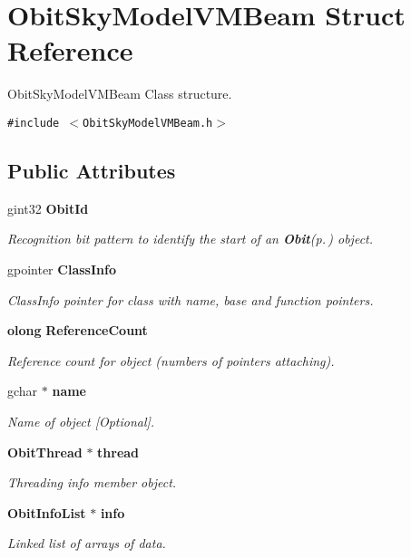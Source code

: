 \section{Obit\-Sky\-Model\-VMBeam Struct Reference}
\label{structObitSkyModelVMBeam}
Obit\-Sky\-Model\-VMBeam Class structure.  


{\tt \#include $<$Obit\-Sky\-Model\-VMBeam.h$>$}

\subsection*{Public Attributes}
\begin{CompactItemize}
\item 
gint32 {\bf Obit\-Id}
\begin{CompactList}\small\item\em Recognition bit pattern to identify the start of an {\bf Obit}{\rm (p.\,\pageref{structObit})} object. \item\end{CompactList}\item 
gpointer {\bf Class\-Info}
\begin{CompactList}\small\item\em Class\-Info pointer for class with name, base and function pointers. \item\end{CompactList}\item 
{\bf olong} {\bf Reference\-Count}
\begin{CompactList}\small\item\em Reference count for object (numbers of pointers attaching). \item\end{CompactList}\item 
gchar $\ast$ {\bf name}
\begin{CompactList}\small\item\em Name of object [Optional]. \item\end{CompactList}\item 
{\bf Obit\-Thread} $\ast$ {\bf thread}
\begin{CompactList}\small\item\em Threading info member object. \item\end{CompactList}\item 
{\bf Obit\-Info\-List} $\ast$ {\bf info}
\begin{CompactList}\small\item\em Linked list of arrays of data. \item\end{CompactList}\item 

\end{CompactItemize}
